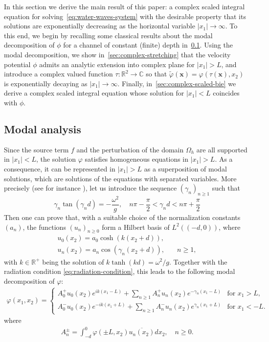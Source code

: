 \documentclass[11pt]{article}
\newcommand{\R}{\mathbb{R}}
\newcommand{\C}{\mathbb{C}}
\newcommand{\bx}{\mathbf{x}}
\newcommand{\tvarphi}{\tilde \varphi}
\begin{document}
In this section we derive the main result of this paper: a complex scaled
integral equation for solving~\cref{eq:water-waves-system} with the desirable
property that its solutions are exponentially decreasing as the horizontal
variable $|x_1| \to \infty$. To this end, we begin by recalling some classical
results about the modal decomposition of $\phi$ for a channel of constant
(finite) depth in~\cref{sec:modal-analysis}. Using the modal decomposition, we
show in~\cref{sec:complex-stretching} that the velocity potential $\phi$ admits
an analytic extension into complex plane for $|x_1| > L$, and introduce a
complex valued function $\tau : \R^2 \to \C$ so that $\tvarphi(\bx) =
\varphi(\tau(\bx),x_2)$ is exponentially decaying as $|x_1| \to \infty$.
Finally, in~\cref{sec:complex-scaled-bie} we derive a complex scaled integral
equation whose solution for $|x_1| < L$ coincides with $\phi.$

\subsection{Modal analysis}\label{sec:modal-analysis}

Since the source term $f$ and the perturbation of the domain $\Omega_h$ are all
supported in $|x_1|<L$,  the solution $\varphi$ satisfies homogeneous equations
in $|x_1|>L$. As a consequence, it can be represented in $|x_1|>L$ as a
superposition of modal solutions,  which are solutions of the equations with
separated variables. More precisely (see for instance \cite{Bon-Jol-1993}), let
us introduce the sequence $(\gamma_n)_{n\geq 1}$ such that
\begin{equation}
  \label{eq:disp-evanescent}
  \gamma_n\tan(\gamma_n d)=-\dfrac{\omega^2}{g},\quad n\pi-\frac{\pi}{2}<\gamma_n d<n\pi+\frac{\pi}{2}
\end{equation}
Then one can prove that, with a suitable choice of the normalization constants
$(a_n)$, the functions $(u_n)_{n\geq 0}$ form a Hilbert basis of $L^2((-d,0))$,
where
\begin{align}
\label{eq:transversemodes}
u_0(x_2)=a_0\cosh(k(x_2+d)),&\\
u_n(x_2)=a_n\cos(\gamma_n(x_2+d)),& \quad n\geq 1,
\end{align}
with $k \in \R^+$ being the solution of $k\tanh(kd)=\omega^2/g$. Together with
the radiation condition \cref{eq:radiation-condition}, this leads to the
following modal decomposition of $\varphi$:
%
\begin{align}
  \label{eq:modaldecomp}
  \varphi(x_1,x_2) = \begin{cases}
  A_0^+u_0(x_2)e^{ik(x_1-L)} + \sum_{n\geq 1}A_n^+u_n(x_2)e^{-\gamma_n(x_1-L)} &\mbox{for }x_1>L,\\
  A_0^-u_0(x_2)e^{-ik(x_1+L)} +\sum_{n\geq 1}A_n^-u_n(x_2)e^{\gamma_n(x_1+L)} &\mbox{for }x_1<-L.
  \end{cases}
\end{align}
where 
\begin{align}
  A_n^\pm=\int_{-d}^0\varphi(\pm L,x_2)\overline{u_n(x_2)}dx_2,\quad n\geq 0.  
\end{align}
\end{document}
